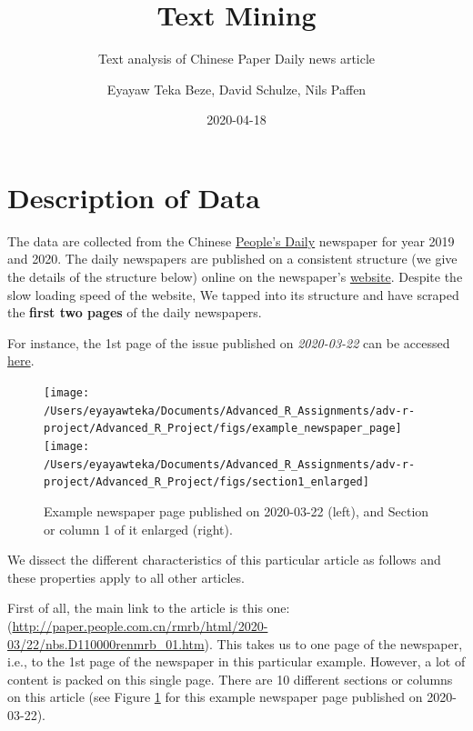 \documentclass[
  12pt,
]{article}
\title{Text Mining}
\subtitle{Text analysis of Chinese Paper Daily news article}
\author{Eyayaw Teka Beze, David Schulze, Nils Paffen}
\date{2020-04-18}
\begin{document}
\maketitle

{
\hypersetup{linkcolor=}
\setcounter{tocdepth}{2}
\tableofcontents
}
\hypertarget{description-of-data}{%
\section{Description of Data}\label{description-of-data}}

The data are collected from the Chinese \href{https://en.wikipedia.org/wiki/People\%27s_Daily}{People's Daily} newspaper for year 2019 and 2020. The daily newspapers are published on a consistent structure (we give the details of the structure below) online on the newspaper's \href{paper.people.com.cn}{website}. Despite the slow loading speed of the website, We tapped into its structure and have scraped the \textbf{first two pages} of the daily newspapers.

For instance, the 1st page of the issue published on \emph{2020-03-22} can be accessed \href{http://paper.people.com.cn/rmrb/html/2020-03/22/nbs.D110000renmrb_01.htm}{here}.

\begin{figure}

{\centering \texttt{[image: /Users/eyayawteka/Documents/Advanced\_R\_Assignments/adv-r-project/Advanced\_R\_Project/figs/example\_newspaper\_page]} \texttt{[image: /Users/eyayawteka/Documents/Advanced\_R\_Assignments/adv-r-project/Advanced\_R\_Project/figs/section1\_enlarged]} 

}

\caption{Example newspaper page published on 2020-03-22 (left), and Section or column 1 of it enlarged (right).}\label{fig:example-newspaper}
\end{figure}

We dissect the different characteristics of this particular article as follows and these properties apply to all other articles.

First of all, the main link to the article is this one: (\url{http://paper.people.com.cn/rmrb/html/2020-03/22/nbs.D110000renmrb_01.htm}). This takes us to one page of the newspaper, i.e., to the 1st page of the newspaper in this particular example. However, a lot of content is packed on this single page. There are 10 different sections or columns on this article (see Figure \ref{fig:example-newspaper} for this example newspaper page published on 2020-03-22).
\end{document}
